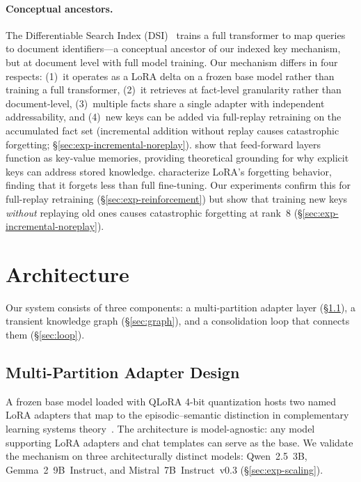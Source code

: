 \documentclass[11pt]{article}
\begin{document}
\paragraph{Conceptual ancestors.}
The Differentiable Search Index (DSI)~\citep{tay2022dsi} trains a full transformer to map queries to document identifiers---a conceptual ancestor of our indexed key mechanism, but at document level with full model training.
Our mechanism differs in four respects: (1)~it operates as a LoRA delta on a frozen base model rather than training a full transformer, (2)~it retrieves at fact-level granularity rather than document-level, (3)~multiple facts share a single adapter with independent addressability, and (4)~new keys can be added via full-replay retraining on the accumulated fact set (incremental addition without replay causes catastrophic forgetting; \S\ref{sec:exp-incremental-noreplay}).
\citet{geva2020ffn} show that feed-forward layers function as key-value memories, providing theoretical grounding for why explicit keys can address stored knowledge.
\citet{biderman2024lora} characterize LoRA's forgetting behavior, finding that it forgets less than full fine-tuning. Our experiments confirm this for full-replay retraining (\S\ref{sec:exp-reinforcement}) but show that training new keys \emph{without} replaying old ones causes catastrophic forgetting at rank~8 (\S\ref{sec:exp-incremental-noreplay}).

\section{Architecture}
\label{sec:arch}

Our system consists of three components: a multi-partition adapter layer (\S\ref{sec:adapters}), a transient knowledge graph (\S\ref{sec:graph}), and a consolidation loop that connects them (\S\ref{sec:loop}).

\subsection{Multi-Partition Adapter Design}
\label{sec:adapters}

A frozen base model loaded with QLoRA 4-bit quantization hosts two named LoRA adapters that map to the episodic--semantic distinction in complementary learning systems theory~\citep{mcclelland1995complementary}.
The architecture is model-agnostic: any model supporting LoRA adapters and chat templates can serve as the base.
We validate the mechanism on three architecturally distinct models: Qwen~2.5~3B, Gemma~2~9B~Instruct, and Mistral~7B~Instruct~v0.3 (\S\ref{sec:exp-scaling}).
\end{document}
